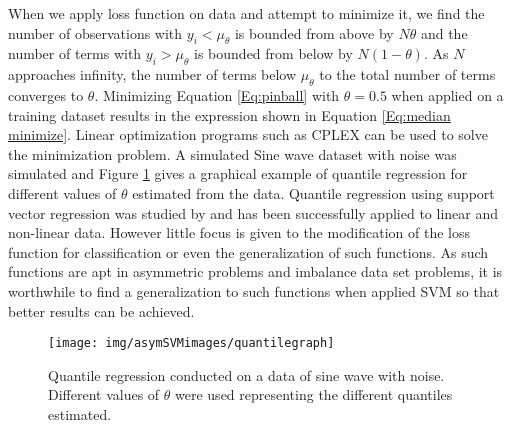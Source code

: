 \documentclass[twoside,11pt]{article}
\begin{document}
When we apply loss function on data and attempt to minimize it,	we find the number of observations with $y_i < \mu_{\theta}$ is bounded from above by $N\theta$ and the number of terms with $y_i > \mu_{\theta}$ is bounded from below by $N(1-\theta)$. As $N$ approaches infinity, the number of terms below $\mu_{\theta}$ to the total number of terms converges to $\theta$. Minimizing Equation \ref{Eq:pinball} with $\theta=0.5$ when applied on a training dataset results in the expression shown in Equation \ref{Eq:median minimize}. Linear optimization programs such as CPLEX can be used to solve the minimization problem. A simulated Sine wave dataset with noise was simulated and Figure \ref{Fig:Quantile Regression} gives a graphical example of quantile regression for different values of $\theta$ estimated from the data. Quantile regression using support vector regression was studied by \citet{Changha05} and has been successfully applied to linear and non-linear data. However little focus is given to the modification of the loss function for classification or even the generalization of such functions. As such functions are apt in asymmetric problems and imbalance data set problems, it is worthwhile to find a generalization to such functions when applied SVM so that better results can be achieved. 

\begin{figure}
 \centering
\texttt{[image: img/asymSVMimages/quantilegraph]}\\
 \caption{Quantile regression conducted on a data of sine wave with noise. Different values of $\theta$ were used representing the different quantiles estimated.}
 \label{Fig:Quantile Regression}
\end{figure}
\end{document}

